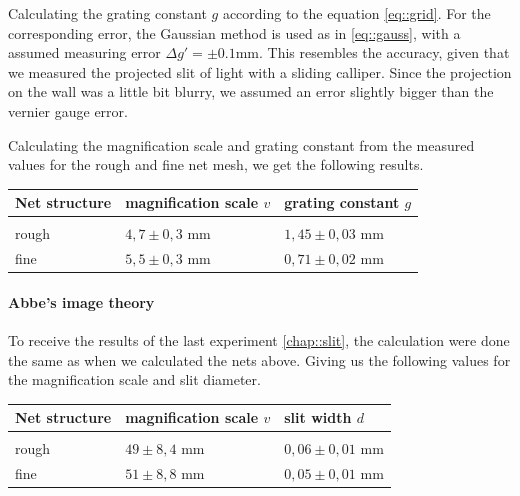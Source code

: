 Calculating the grating constant $g$ according to the equation \ref{eq::grid}.
For the corresponding error, the Gaussian method is used as in \ref{eq::gauss}, with a assumed measuring error $\Delta g' = \pm 0.1$\si{\milli \m}.
This resembles the accuracy, given that we measured the projected slit of light with a sliding calliper.
Since the projection on the wall was a little bit blurry, we assumed an error slightly bigger than the vernier gauge error.

Calculating the magnification scale and grating constant from the measured values for the rough and fine net mesh, we get the following results.

\begin{tabularx}{\textwidth}{XM{5cm}M{5cm}}%
	\toprule 
	Net structure&magnification scale $v$ & grating constant $g$\\
	\hline
	&&\\[-5pt]
	rough	& $4,7\pm 0,3$ \si{\milli \m} & $1,45 \pm 0,03$ \si{\milli \m}	\\
	fine	& $5,5\pm 0,3$ \si{\milli \m} & $0,71 \pm 0,02$ \si{\milli \m}	\\	
	\bottomrule 
\end{tabularx}


\paragraph{Abbe's image theory}
To receive the results of the last experiment \ref{chap::slit}, the calculation were done the same as when we calculated the nets above. 
Giving us the following values for the magnification scale and slit diameter.

\begin{tabularx}{\textwidth}{XM{5cm}M{5cm}}%
	\toprule 
	Net structure&magnification scale $v$ & slit width $d$\\
	\hline
	&&\\[-5pt]
	rough	& $49\pm 8,4$ \si{\milli \m} & $0,06 \pm 0,01$ \si{\milli \m}	\\
	fine	& $51\pm 8,8$ \si{\milli \m} & $0,05 \pm 0,01$ \si{\milli \m}	\\	
	\bottomrule 
\end{tabularx}











